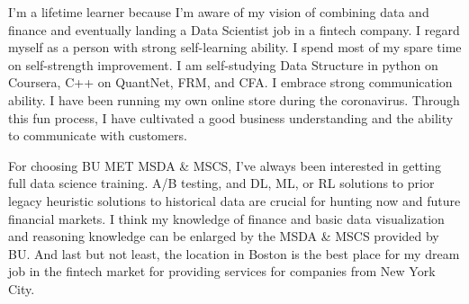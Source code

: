 \documentclass[a4paper,english]{article}
\begin{document}
I'm a lifetime learner because I'm aware of my vision of combining data and finance and eventually landing a Data Scientist job in a fintech company. I regard myself as a person with strong self-learning ability. I spend most of my spare time on self-strength improvement. I am self-studying Data Structure in python on Coursera, C++ on QuantNet, FRM, and CFA. I embrace strong communication ability. I have been running my own online store during the coronavirus. Through this fun process, I have cultivated a good business understanding and the ability to communicate with customers.

For choosing BU MET MSDA \& MSCS, I've always been interested in getting full data science training. A/B testing, and DL, ML, or RL solutions to prior legacy heuristic solutions to historical data are crucial for hunting now and future financial markets. I think my knowledge of finance and basic data visualization and reasoning knowledge can be enlarged by the MSDA \& MSCS provided by BU. And last but not least, the location in Boston is the best place for my dream job in the fintech market for providing services for companies from New York City.
\end{document}
